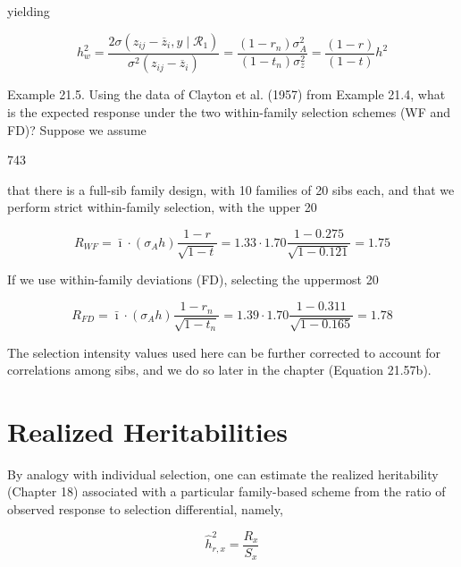 \documentclass{article}
\begin{document}
yielding

\begin{equation}
h_{w}^{2}=\frac{2\sigma(z_{ij}-\overline{z}_{i},y\mid\mathcal{R}_{1})}{\sigma^{2}(z_{ij}-\overline{z}_{i})}=\frac{(1-r_{n})\sigma_{A}^{2}}{(1-t_{n})\sigma_{z}^{2}}=\frac{(1-r)}{(1-t)}h^{2}
\tag{21.23}
\label{eq:21_23}
\end{equation}

Example 21.5. Using the data of Clayton et al. (1957) from Example 21.4, what is the expected response under the two within-family selection schemes (WF and FD)? Suppose we assume

743

that there is a full-sib family design, with 10 families of 20 sibs each, and that we perform strict within-family selection, with the upper 20%

\begin{equation}
R_{WF}=\bar{\imath}\cdot(\sigma_{A}h)\frac{1-r}{\sqrt{1-t}}=1.33\cdot1.70\frac{1-0.275}{\sqrt{1-0.121}}=1.75
\end{equation}

If we use within-family deviations (FD), selecting the uppermost 20%

\begin{equation}
R_{FD}=\bar{\imath}\cdot(\sigma_{A}h)\frac{1-r_{n}}{\sqrt{1-t_{n}}}=1.39\cdot1.70\frac{1-0.311}{\sqrt{1-0.165}}=1.78
\end{equation}

The selection intensity values used here can be further corrected to account for correlations among sibs, and we do so later in the chapter (Equation 21.57b).

\section{Realized Heritabilities}
By analogy with individual selection, one can estimate the realized heritability (Chapter 18) associated with a particular family-based scheme from the ratio of observed response to selection differential, namely,

\begin{equation}
\widehat{h}_{r,x}^{2}=\frac{R_{x}}{S_{x}}
\tag{21.24a}
\label{eq:21_24a}
\end{equation}
\end{document}
